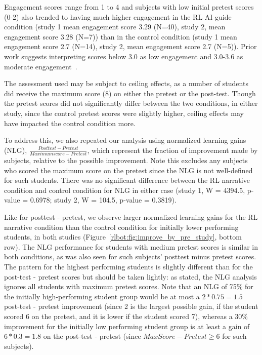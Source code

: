 \documentclass[sn-mathphys,Numbered]{sn-jnl}%
\theoremstyle{thmstyleone}%
\theoremstyle{thmstyletwo}%
\theoremstyle{thmstylethree}%
\begin{document}
 Engagement scores range from 1 to 4 and subjects with low initial pretest scores (0-2) also trended to having much higher engagement in the RL AI guide condition (study 1 mean engagement score 3.29 (N=40), study 2, mean engagement score 3.28 (N=7)) than in the control condition (study 1 mean engagement score 2.7 (N=14), study 2, mean engagement score 2.7 (N=5)).    
 Prior work suggests interpreting scores below 3.0 as low engagement and 3.0-3.6 as moderate engagement~\cite{giggle_gauge}.

The assessment used may be subject to ceiling effects, as a number of students did receive the maximum score (8) on either the pretest or the post-test. Though the pretest scores did not significantly differ between the two conditions, in either study, since the control pretest scores were slightly higher, ceiling effects may have impacted the control condition more.

To address this, we also repeated our analysis using normalized learning gains (NLG), $\frac{Post test - Pretest}{Maximum score - Pretest}$, which represent the fraction of improvement made by subjects, relative to the possible improvement. Note this excludes any subjects who scored the maximum score on the pretest since the NLG is not well-defined for such students. There was no significant difference between the RL narrative condition and control condition for NLG in either case (study 1, W = 4394.5, p-value = 0.6978; study 2, W = 104.5, p-value = 0.3819). 

Like for posttest - pretest, we observe larger normalized learning gains for the RL narrative condition than the control condition for initially lower performing students, in both studies (Figure~\ref{rlbot:fig:improve_by_pre_study}, bottom row). The NLG performance for students with medium pretest scores is similar in both conditions, as was also seen for such subjects' posttest minus pretest scores. The pattern for the highest performing students is slightly different than for the post-test - pretest scores but should be taken lightly: as stated, the NLG analysis ignores all students with maximum pretest scores. Note that an NLG of 75\% for the initially high-performing student group would be at most a $2*0.75=1.5$ post-test - pretest improvement (since 2 is the largest possible gain, if the student scored 6 on the pretest, and it is lower if the student scored 7), whereas a 30\% improvement for the initially low performing student group is at least a gain of $6*0.3=1.8$ on the post-test - pretest (since $MaxScore - Pretest \geq 6$ for such subjects). 
\end{document}
